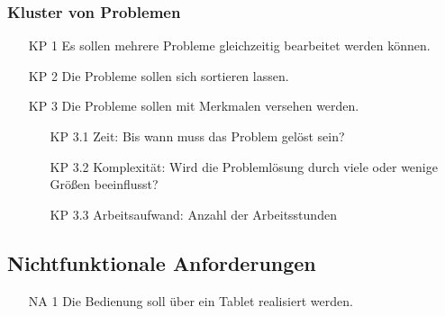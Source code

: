 \subsubsection*{Kluster von Problemen}
\begin{itemize}
\item[KP 1] Es sollen mehrere Probleme gleichzeitig bearbeitet werden können.
\item[KP 2] Die Probleme sollen sich sortieren lassen.
\item[KP 3] Die Probleme sollen mit Merkmalen versehen werden.
	\begin{itemize}
	\item[KP 3.1] Zeit: Bis wann muss das Problem gelöst sein?
	\item[KP 3.2] Komplexität: Wird die Problemlösung durch viele oder wenige Größen beeinflusst?
	\item[KP 3.3] Arbeitsaufwand: Anzahl der Arbeitsstunden
	\end{itemize}
\end{itemize}

\subsection{Nichtfunktionale Anforderungen}
\begin{itemize}
\item[NA 1] Die Bedienung soll über ein Tablet realisiert werden.
\end{itemize}
